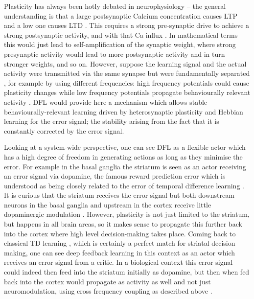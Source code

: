 \documentclass{aamas2018}
\begin{document}
Plasticity has always been hotly debated in neurophysiology -- the
general understanding is that a large postsynaptic Calcium
concentration causes LTP \cite{Malenka99,Bennett2000} and a low one
causes LTD \cite{Mulkey1992}. This requires a strong pre-synaptic
drive to achieve a strong postsynaptic activity, and with that Ca
influx \cite{Meunier2017}. In mathematical terms this would just lead
to self-amplification of the synaptic weight, where strong presynaptic
activity would lead to more postsynaptic activity and in turn stronger
weights, and so on. However, suppose the learning signal and the
actual activity were transmitted via the same synapse but were
fundamentally separated \cite{Lindsay2017}, for example by using
different frequencies: high frequency potentials could cause
plasticity changes while low frequency potentials propagate
behaviourally relevant activity \cite{Canolty2010}. DFL would provide
here a mechanism which allows stable behaviourally-relevant learning
driven by heterosynaptic plasticity and Hebbian learning for the error
signal; the stability arising from the fact that it is constantly
corrected by the error signal.

Looking at a system-wide perspective, one can see DFL as a flexible
actor which has a high degree of freedom in generating actions as long as they
minimise the error. For example in the basal ganglia the striatum is
seen as an actor receiving an error signal via dopamine, the famous
reward prediction error \cite{Schultz97} which is understood as being
closely related to the error of temporal difference learning
\cite{gurney98:_basal_gangl_action_selec_devic}. It is curious that
the striatum receives the error signal but both downstream neurons in
the basal ganglia and upstream in the cortex receive little
dopaminergic modulation \cite{Beckstead1979}. However, plasticity is
not just limited to the striatum, but happens in all brain areas, so
it makes sense to propagate this further back into the cortex
\cite{Groenewegen1993} where high level decision-making takes place.
Coming back to classical TD learning \cite{Sutton87}, which is
certainly a perfect match for striatal decision making, one can see
deep feedback learning in this context as an actor which receives an
error signal from a critic. In a biological context this error signal
could indeed then feed into the striatum initially as dopamine, but
then when fed back into the cortex would propagate as activity
as well and not just neuromodulation, using cross frequency coupling
as described above \cite{Lipski2017}.
\end{document}
